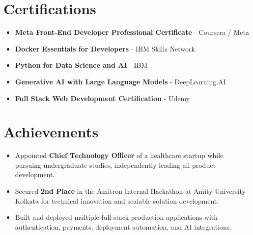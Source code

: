 \documentclass[letterpaper,10pt]{article}
\newcommand{\resumeItem}[1]{
    \item\small{#1\vspace{-2pt}}
}
\newcommand{\resumeItemListStart}{\begin{itemize}[leftmargin=0.2in]}
\newcommand{\resumeItemListEnd}{\end{itemize}\vspace{-5pt}}
\begin{document}
\vspace{-4pt}

\section{Certifications}

\resumeItemListStart
    \resumeItem{\textbf{Meta Front-End Developer Professional Certificate} - Coursera / Meta}
    \resumeItem{\textbf{Docker Essentials for Developers} - IBM Skills Network}
    \resumeItem{\textbf{Python for Data Science and AI} - IBM}
    \resumeItem{\textbf{Generative AI with Large Language Models} - DeepLearning.AI}
    \resumeItem{\textbf{Full Stack Web Development Certification} - Udemy}
\resumeItemListEnd

\vspace{-4pt}

\section{Achievements}

\resumeItemListStart
    \resumeItem{Appointed \textbf{Chief Technology Officer} of a healthcare startup while pursuing undergraduate studies, independently leading all product development.}
    \resumeItem{Secured \textbf{2nd Place} in the Amitron Internal Hackathon at Amity University Kolkata for technical innovation and scalable solution development.}
    \resumeItem{Built and deployed multiple full-stack production applications with authentication, payments, deployment automation, and AI integrations.}
\resumeItemListEnd

\end{document}
